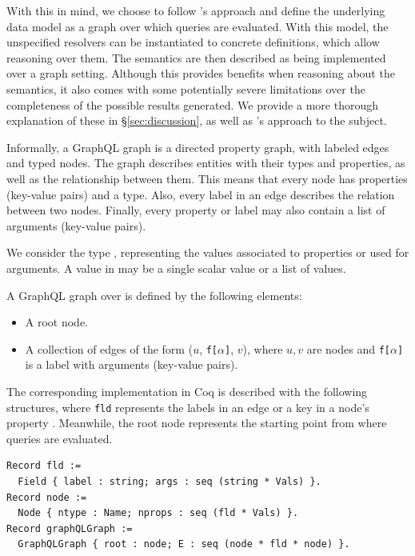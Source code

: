 With this in mind, we choose to follow \HP{}'s approach and define the underlying data model as a graph over which queries are evaluated. With this model, the unspecified resolvers can be instantiated to concrete definitions, which allow reasoning over them. The semantics are then described as being implemented over a graph setting. Although this provides benefits when reasoning about the semantics, it also comes with some potentially severe limitations over the completeness of the possible results generated. We provide a more thorough explanation of these in \S\ref{sec:discussion}, as well as \HP{}'s approach to the subject.

Informally, a GraphQL graph is a directed property graph, with labeled edges and typed nodes. The graph describes entities with their types and properties, as well as the relationship between them. This means that every node has properties (key-value pairs) and a type. Also, every label in an edge describes the relation between two nodes. Finally, every property or label may also contain a list of arguments (key-value pairs).

We consider the type \Vals, representing the values associated to properties or used for arguments. A value in \Vals{} may be a single scalar value or a list of values.

\begin{definition}
A GraphQL graph over \Vals{} is defined by the following elements:
\begin{itemize}
    \item A root node.
    \item A collection of edges of the form ($u$, \texttt{f[}$\alpha$\texttt{]}, $v$), where $u, v$ are nodes and \texttt{f[}$\alpha$\texttt{]} is a label with arguments (key-value pairs).
\end{itemize}
\end{definition}

The corresponding implementation in Coq is described with the following structures, where \texttt{fld} represents the labels in an edge or a key in a node's property . 
Meanwhile, the root node represents the starting point from where queries are evaluated.

\begin{verbatim}
Record fld := 
  Field { label : string; args : seq (string * Vals) }.
Record node := 
  Node { ntype : Name; nprops : seq (fld * Vals) }.
Record graphQLGraph := 
  GraphQLGraph { root : node; E : seq (node * fld * node) }.
\end{verbatim}

